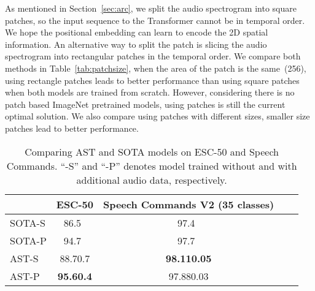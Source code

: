 \documentclass[a4paper]{article}
\newcommand{\squeezeup}{\vspace{-2.0mm}}
\begin{document}
 As mentioned in Section~\ref{sec:arc}, we split the audio spectrogram into  square patches, so the input sequence to the Transformer cannot be in temporal order. We hope the positional embedding can learn to encode the 2D spatial information. An alternative way to split the patch is slicing the audio spectrogram into rectangular patches in the temporal order. We compare both methods in Table~\ref{tab:patchsize}, when the area of the patch is the same~(256), using  rectangle patches leads to better performance than using  square patches when both models are trained from scratch. However, considering there is no  patch based ImageNet pretrained models, using  patches is still the current optimal solution. We also compare using patches with different sizes, smaller size patches lead to better performance.

\begin{table}[t]
\footnotesize
\centering
\caption{Comparing AST and SOTA models on ESC-50 and Speech Commands. ``-S'' and ``-P'' denotes model trained without and with additional audio data, respectively.}
\label{tab:transfer}
\begin{tabular}{@{}lcccc@{}}
\toprule
                         & ESC-50 & Speech Commands V2 (35 classes)  \\ \midrule
SOTA-S  &          86.5~\cite{sailor2017unsupervised}                  &     97.4~\cite{majumdar2020matchboxnet}                                                                                                  \\
SOTA-P  &        94.7~\cite{kong2020panns}                    &     97.7~\cite{lin2020training}                                                                                      \\ \midrule
AST-S                       &   88.70.7                    &   \bf{98.110.05}                                                                           \\

AST-P                     &  \bf{95.60.4}                         &   97.880.03                                                                           \\
\bottomrule
\end{tabular}
\squeezeup
\end{table}
\end{document}
